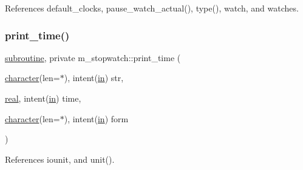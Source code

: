 References default\+\_\+clocks, pause\+\_\+watch\+\_\+actual(), type(), watch, and watches.

\mbox{\label{namespacem__stopwatch_a53db4833863b567afa71540bd9aad8f5}} 
\subsubsection{\texorpdfstring{print\+\_\+time()}{print\_time()}}
{\footnotesize\ttfamily \hyperlink{M__stopwatch_83_8txt_acfbcff50169d691ff02d4a123ed70482}{subroutine}, private m\+\_\+stopwatch\+::print\+\_\+time (\begin{DoxyParamCaption}\item[{\hyperlink{option__stopwatch_83_8txt_abd4b21fbbd175834027b5224bfe97e66}{character}(len=$\ast$), intent(\hyperlink{M__journal_83_8txt_afce72651d1eed785a2132bee863b2f38}{in})}]{str,  }\item[{\hyperlink{read__watch_83_8txt_abdb62bde002f38ef75f810d3a905a823}{real}, intent(\hyperlink{M__journal_83_8txt_afce72651d1eed785a2132bee863b2f38}{in})}]{time,  }\item[{\hyperlink{option__stopwatch_83_8txt_abd4b21fbbd175834027b5224bfe97e66}{character}(len=$\ast$), intent(\hyperlink{M__journal_83_8txt_afce72651d1eed785a2132bee863b2f38}{in})}]{form }\end{DoxyParamCaption})\hspace{0.3cm}{\ttfamily [private]}}



References iounit, and unit().

\mbox{\label{namespacem__stopwatch_a1069de62b768281802b7d9528929f216}} 
